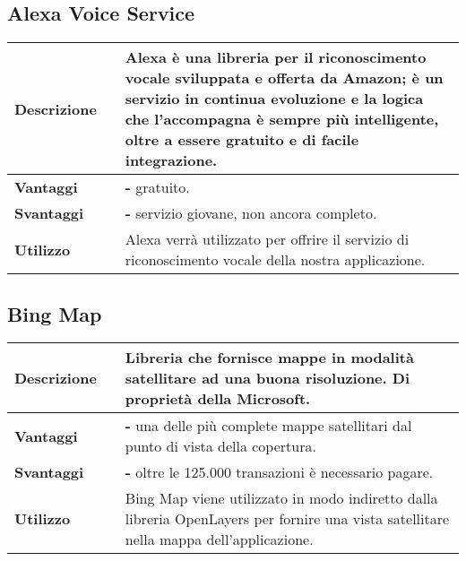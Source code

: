 \newpage
\subsection{Alexa Voice Service}
\label{Alexa Voice Service}
\begin{table}[H]
	\centering
	\begin{tabular}{p{2cm}p{0.5cm}p{11.5cm}}
	\arrayrulecolor{lightgray}
	\toprule
	\textbf{Descrizione} & &
		Alexa è una libreria per il riconoscimento vocale sviluppata e offerta da Amazon; è un servizio in continua evoluzione e la logica che l'accompagna è sempre più intelligente, oltre a essere gratuito e di facile integrazione.
	\\ \midrule
	\textbf{Vantaggi} & &
		\textbf{- }gratuito.
	\\ \midrule
	\textbf{Svantaggi} & &
		\textbf{- }servizio giovane, non ancora completo.
	\\ \midrule
	\textbf{Utilizzo} & &
		Alexa verrà utilizzato per offrire il servizio di riconoscimento vocale della nostra applicazione.
	\\ \bottomrule
	\end{tabular}
\end{table}


\vspace{40px}
\subsection{Bing Map}
\label{Bing Map}
\begin{table}[H]
	\centering
	\begin{tabular}{p{2cm}p{0.5cm}p{11.5cm}}
		\arrayrulecolor{lightgray}
		\toprule
		\textbf{Descrizione} & &
		Libreria che fornisce mappe in modalità satellitare ad una buona risoluzione. Di proprietà della Microsoft.
		\\ \midrule
		\textbf{Vantaggi} & &
		\textbf{- }una delle più complete mappe satellitari dal punto di vista della copertura.
		\\ \midrule
		\textbf{Svantaggi} & &
		\textbf{- }oltre le 125.000 transazioni è necessario pagare.
		\\ \midrule
		\textbf{Utilizzo} & &
		Bing Map viene utilizzato in modo indiretto dalla libreria OpenLayers per fornire una vista satellitare nella mappa dell'applicazione.
		\\ \bottomrule
	\end{tabular}
\end{table}


\vspace{40px}
